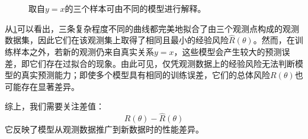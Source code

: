\begin{figure}[H]
{%
	}
	\caption{取自$y=x$的三个样本可由不同的模型进行解释。}
	\label{fig:overfitting-three-points}
\end{figure}
从\cref{fig:overfitting-three-points}可以看出，三条复杂程度不同的曲线都完美地拟合了由三个观测点构成的观测数据集，因此它们在该观测集上取得了相同且最小的经验风险$\hat{R}(\theta)$。然而，在训练样本之外，若新的观测仍来自真实关系$y=x$，这些模型会产生较大的预测误差，即它们存在过拟合的现象。由此可见，仅凭观测数据上的经验风险无法判断模型的真实预测能力；即使多个模型具有相同的训练误差，它们的总体风险$R(\theta)$也可能存在显著差异。\par
综上，我们需要关注差值：
\begin{equation*}
	R(\theta)-\hat{R}(\theta)
\end{equation*}
它反映了模型从观测数据推广到新数据时的性能差异。
